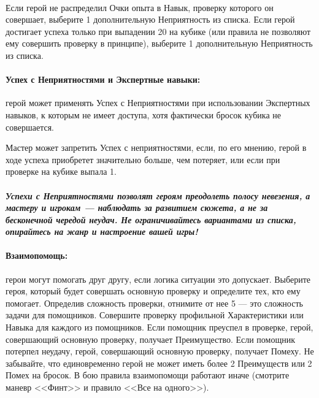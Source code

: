 \paragraph{}Если герой не распределил Очки опыта в Навык, проверку которого он совершает, выберите 1 дополнительную Неприятность из списка.
Если герой достигает успеха только при выпадении 20 на кубике (или правила не позволяют ему совершить проверку в принципе), выберите 1 дополнительную Неприятность из списка.
\paragraph{Успех с Неприятностями и Экспертные навыки:} герой может применять Успех с Неприятностями при использовании Экспертных навыков, к которым не имеет доступа, хотя фактически бросок кубика не совершается.
\begin{tcolorbox}
Мастер может запретить Успех с неприятностями, если, по его мнению, герой в ходе успеха приобретет значительно больше, чем потеряет, или если при проверке на кубике выпала 1.
\end{tcolorbox}
\paragraph{\textit{Успехи с Неприятностями позволят героям преодолеть полосу невезения, а мастеру и игрокам — наблюдать за развитием сюжета, а не за бесконечной чередой неудач. Не ограничивайтесь вариантами из списка, опирайтесь на жанр и настроение вашей игры!}}
\paragraph{Взаимопомощь:} герои могут помогать друг другу, если логика ситуации это допускает. Выберите героя, который будет совершать основную проверку и определите тех, кто ему помогает. Определив сложность проверки, отнимите от нее 5 — это сложность задачи для помощников. Совершите проверку профильной Характеристики или Навыка для каждого из помощников. Если помощник преуспел в проверке, герой, совершающий основную проверку, получает Преимущество. Если помощник потерпел неудачу, герой, совершающий основную проверку, получает Помеху. Не забывайте, что единовременно герой не может иметь более 2 Преимуществ или 2 Помех на бросок.
\newline В бою правила взаимопомощи работают иначе (смотрите маневр <<Финт>> и правило <<Все на одного>>).